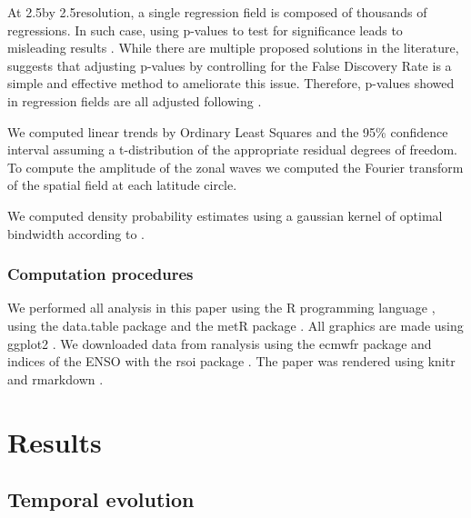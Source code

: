 \documentclass[]{ametsocV5}
\begin{document}
At 2.5\degree by 2.5\degree resolution, a single regression field is composed of thousands of regressions. In such case, using p-values to test for significance leads to misleading results \citep{walker1914, katz1991}. While there are multiple proposed solutions in the literature, \citet{wilks2016} suggests that adjusting p-values by controlling for the False Discovery Rate \citep{benjamini1995} is a simple and effective method to ameliorate this issue. Therefore, p-values showed in regression fields are all adjusted following \citet{benjamini1995}.

We computed linear trends by Ordinary Least Squares and the 95\% confidence interval assuming a t-distribution of the appropriate residual degrees of freedom. To compute the amplitude of the zonal waves we computed the Fourier transform of the spatial field at each latitude circle.

We computed density probability estimates using a gaussian kernel of optimal bindwidth according to \citet{sheather1991}.

\subsubsection{Computation procedures}

We performed all analysis in this paper using the R programming language \citep{rcoreteam2020}, using the data.table package \citep{dowle2020} and the metR package \citep{campitelli2020}. All graphics are made using ggplot2 \citep{wickham2009}. We downloaded data from ranalysis using the ecmwfr package \citep{hufkens2020} and indices of the ENSO with the rsoi package \citep{albers2020}. The paper was rendered using knitr and rmarkdown \citep{xie2015, allaire2019}.

\hypertarget{results}{%
\section{Results}\label{results}}

\hypertarget{temporal}{%
\subsection{Temporal evolution}\label{temporal}}
\end{document}
